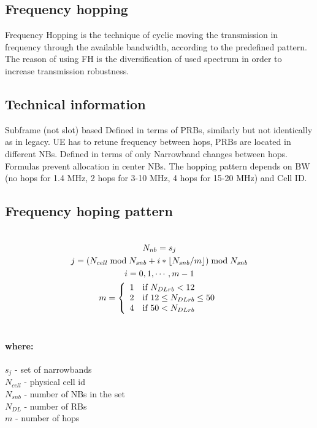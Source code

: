 \documentclass[12pt]{article}
\DeclarePairedDelimiter\floor{\lfloor}{\rfloor}
\begin{document}
\subsection{Frequency hopping}
Frequency Hopping is the technique of cyclic moving the transmission in frequency through the available bandwidth, according to the predefined pattern. The reason of using FH is the diversification of used spectrum in order to increase transmission robustness.

\subsection{Technical information}
Subframe (not slot) based
Defined in terms of PRBs, similarly but not identically as in legacy.
UE has to retune frequency between hops, PRBs are located in different NBs.
Defined in terms of only Narrowband changes between hops.
Formulas prevent allocation in center NBs.
The hopping pattern depends on BW (no hops for 1.4 MHz, 2 hops for 3-10 MHz, 4 hops for 15-20 MHz) and Cell ID.



\subsection{Frequency hoping pattern}
\begin{align*}
\begin{multlined} \\
N_{nb}=s_j  \\
j=(N_{cell}\bmod N_{s nb}+i*\floor*{N_{snb}/m})\bmod N_{snb} \\
i=0,1,\cdots,m-1 \\
m = \left\{
\begin{array}{ll}
1 & \mbox{if } N_{DLrb} < 12 \\
2 & \mbox{if } 12 \leq N_{DLrb} \leq 50 \\
4 & \mbox{if } 50 < N_{DLrb} \\
\end{array}\right.  \\ 
\end{multlined}
\end{align*}

\paragraph{where:\\}
$s_j$ - set of narrowbands \\
$N_{cell}$ - physical cell id \\
$N_{snb}$ - number of NBs in the set \\
$N_{DL}$ - number of RBs \\
$m$ - number of hops \\
\end{document}
